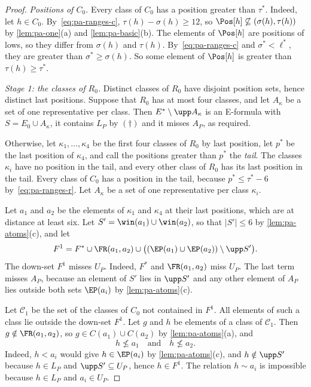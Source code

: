 \begin{proof}
\emph{Positions of $C_0$.}
Every class of $C_0$ has a position greater than $\tau^*$.
Indeed, let $h \in C_0$.
By~\eqref{eq:pa-ranges-c}, $\tau(h) - \sigma(h) \geq 12$, so $\Pos[h] \not\subseteq (\sigma(h), \tau(h))$ by \cref{lem:pa-one}(a) and \cref{lem:pa-basic}(b).
The elements of $\Pos[h]$ are positions of lows, so they differ from $\sigma(h)$ and $\tau(h)$.
By~\eqref{eq:pa-ranges-c} and $\sigma^* < \ell^*$, they are greater than $\sigma^* \geq \sigma(h)$.
So some element of $\Pos[h]$ is greater than $\tau(h) \geq \tau^*$.

\emph{Stage 1: the classes of $R_0$.}
Distinct classes of $R_0$ have disjoint position sets, hence distinct last positions.
Suppose that $R_0$ has at most four classes, and let $A_\kappa$ be a set of one representative per class.
Then $E^* \setminus \upp A_\kappa$ is an E-formula with $S = E_0 \cup A_\kappa$, it contains $L_P$ by $(\dagger)$ and it misses $A_P$, as required.

Otherwise, let $\kappa_1, \dots, \kappa_4$ be the first four classes of $R_0$ by last position, let $p^*$ be the last position of $\kappa_4$, and call the positions greater than $p^*$ the \emph{tail}.
The classes $\kappa_i$ have no position in the tail, and every other class of $R_0$ has its last position in the tail.
Every class of $C_0$ has a position in the tail, because $p^* \leq \tau^* - 6$ by~\eqref{eq:pa-ranges-r}.
Let $A_\kappa$ be a set of one representative per class $\kappa_i$.

Let $a_1$ and $a_2$ be the elements of $\kappa_1$ and $\kappa_4$ at their last positions, which are at distance at least six.
Let $S' = \win(a_1) \cup \win(a_2)$, so that $|S'| \leq 6$ by \cref{lem:pa-atoms}(c), and let
\[
F^1 = F^* \cup \FR(a_1, a_2) \cup \bigl((\EP(a_1) \cup \EP(a_2)) \setminus \upp S'\bigr).
\]
The down-set $F^1$ misses $U_P$.
Indeed, $F^*$ and $\FR(a_1, a_2)$ miss $U_P$.
The last term misses $A_P$, because an element of $S'$ lies in $\upp S'$ and any other element of $A_P$ lies outside both sets $\EP(a_i)$ by \cref{lem:pa-atoms}(c).

Let $\mathcal{C}_1$ be the set of the classes of $C_0$ not contained in $F^1$.
All elements of such a class lie outside the down-set $F^1$.
Let $g$ and $h$ be elements of a class of $\mathcal{C}_1$.
Then $g \notin \FR(a_1, a_2)$, so $g \in C(a_1) \cup C(a_2)$ by \cref{lem:pa-atoms}(a), and
\begin{equation}
\label{eq:pa-not-below}
h \not\leq a_1 \quad\text{and}\quad h \not\leq a_2.
\end{equation}
Indeed, $h < a_i$ would give $h \in \EP(a_i)$ by \cref{lem:pa-atoms}(c), and $h \notin \upp S'$ because $h \in L_P$ and $\upp S' \subseteq U_P$, hence $h \in F^1$.
The relation $h \sim a_i$ is impossible because $h \in L_P$ and $a_i \in U_P$.


\end{proof}
